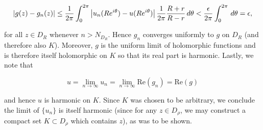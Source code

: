 \begin{solution}
  $$
  |g(z) - g_n(z)| \le \frac{1}{2 \pi}\int_0^{2 \pi} \left|u_n(R e^{i \theta}) - u(R e^{i \theta})\right| \frac{1}{2 \pi}\frac{R + r}{R - r} \, d\theta \\
                  < \frac{\epsilon}{2 \pi}\int_0^{2 \pi} \, d\theta \\
                  = \epsilon,
  $$

  for all $z \in D_R$ whenever $n > N_{D_R}$. Hence $g_n$ converges uniformly to $g$ on $D_R$ (and therefore also $K$). 
  Moreover, $g$ is the uniform limit of holomorphic functions and is therefore itself holomorphic on $K$ so that its 
  real part is harmonic. Lastly, we note that

  $$
  u = \lim\limits_{n \to \infty} u_n = \lim\limits_{n \to \infty} \text{Re}(g_n) = \text{Re}(g)
  $$

  and hence $u$ is harmonic on $K$. Since $K$ was chosen to be arbitrary, we conclude the limit of $\{u_n\}$ is itself
  harmonic (since for any $z \in D_{\rho}$, we may construct a compact set $K \subset D_{\rho}$ which contains $z$), 
  as was to be shown.
  \ \\
\end{solution}
